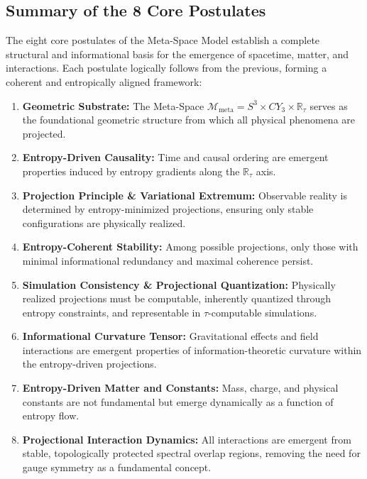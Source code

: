 \documentclass[10.5pt,a4paper]{article}
\begin{document}
\subsection{Summary of the 8 Core Postulates}

The eight core postulates of the Meta-Space Model establish a complete structural and informational basis for the emergence of spacetime, matter, and interactions. Each postulate logically follows from the previous, forming a coherent and entropically aligned framework:

\begin{enumerate}
    \item \textbf{Geometric Substrate:}  
    The Meta-Space \(\mathcal{M}_{\mathrm{meta}} = S^3 \times CY_3 \times \mathbb{R}_\tau\) serves as the foundational geometric structure from which all physical phenomena are projected.
    
    \item \textbf{Entropy-Driven Causality:}  
    Time and causal ordering are emergent properties induced by entropy gradients along the \(\mathbb{R}_\tau\) axis.
    
    \item \textbf{Projection Principle \& Variational Extremum:}  
    Observable reality is determined by entropy-minimized projections, ensuring only stable configurations are physically realized.
    
    \item \textbf{Entropy-Coherent Stability:}  
    Among possible projections, only those with minimal informational redundancy and maximal coherence persist.
    
    \item \textbf{Simulation Consistency \& Projectional Quantization:}  
    Physically realized projections must be computable, inherently quantized through entropy constraints, and representable in \(\tau\)-computable simulations.
    
    \item \textbf{Informational Curvature Tensor:}  
    Gravitational effects and field interactions are emergent properties of information-theoretic curvature within the entropy-driven projections.
    
    \item \textbf{Entropy-Driven Matter and Constants:}  
    Mass, charge, and physical constants are not fundamental but emerge dynamically as a function of entropy flow.
    
    \item \textbf{Projectional Interaction Dynamics:}  
    All interactions are emergent from stable, topologically protected spectral overlap regions, removing the need for gauge symmetry as a fundamental concept.
\end{enumerate}
\end{document}
